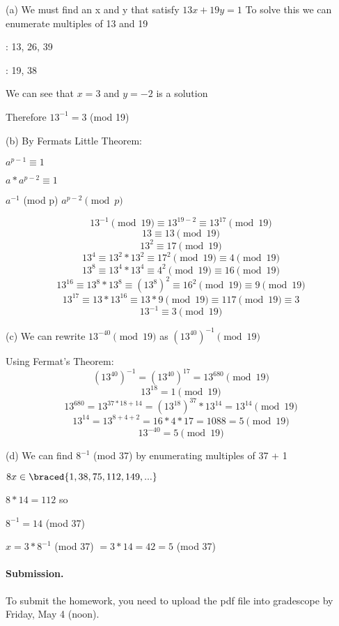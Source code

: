 \documentclass{article}
\begin{document}
\begin{solution}

\smallskip\noindent
(a) We must find an x and y that satisfy $13x + 19y = 1$
To solve this we can enumerate multiples of 13 and 19

: 13, 26, 39

: 19, 38

\noindent
We can see that $x = 3$ and $y = -2$ is a solution

\noindent
Therefore $13^{-1} = 3$ (mod 19)

\smallskip\noindent
(b) By Fermats Little Theorem: 

$a^{p-1} \equiv 1$ 

$a * a^{p-2} \equiv 1$ 

$a^{-1}$ (mod p) \equiv $a^{p-2}\pmod{p}$ 

$$13^{-1} \pmod{19} \equiv 13^{19-2} \equiv 13^{17} \pmod{19}$$
$$13 \equiv 13 \pmod{19}$$
$$13^{2} \equiv 17 \pmod{19}$$
$$13^{4} \equiv 13^{2} * 13^{2} \equiv 17^{2} \pmod{19} \equiv 4 \pmod{19}$$
$$13^{8} \equiv 13^{4} * 13^{4} \equiv 4^{2} \pmod{19} \equiv 16 \pmod{19}$$
$$13^{16} \equiv 13^{8} * 13^{8} \equiv (13^{8})^{2} \equiv 16^{2} \pmod{19} \equiv 9 \pmod{19}$$
$$13^{17} \equiv 13 * 13^{16} \equiv 13*9 \pmod{19} \equiv 117 \pmod{19} \equiv 3$$
$$13^{-1} \equiv 3 \pmod{19}$$

\smallskip\noindent
(c) We can rewrite $13^{-40}\pmod{19}$ as $(13^{40})^{-1}\pmod{19}$

\smallskip\noindent
Using Fermat's Theorem:
$$(13^{40})^{-1} = (13^{40})^{17} = 13^{680}\pmod{19}$$
$$13^{18} = 1 \pmod{19}$$
$$13^{680} = 13^{37*18+14} = (13^{18})^{37}*13^{14} = 13^{14}\pmod{19}$$
$$13^{14} = 13^{8+4+2} = 16*4*17 = 1088 = 5\pmod{19}$$
$$13^{-40} = 5\pmod{19}$$

\smallskip\noindent
(d) We can find $8^{-1}$ (mod 37) by enumerating multiples of 37 + 1

\smallskip\noindent
$8x\in\braced{1, 38, 75, 112, 149, ...}$

\smallskip\noindent
$8 * 14 = 112$ so 

\smallskip\noindent
$8^{-1} = 14$ (mod 37)

\smallskip\noindent
$x = 3 * 8^{-1}$ (mod 37) $ = 3*14 = 42 = 5$ (mod 37)

\end{solution}

\vskip 0.1in
\paragraph{Submission.}
To submit the homework, you need to upload the pdf file into gradescope
by Friday, May 4 (noon).

\end{document}
